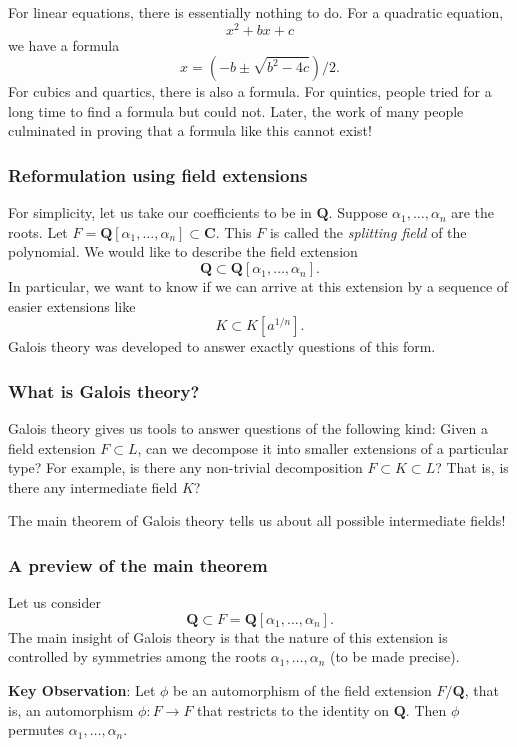 \documentclass[11pt]{article}
\begin{document}
For linear equations, there is essentially nothing to do.
For a quadratic equation,
\[ x^2 + bx + c\]
we have a formula
\[ x = (-b \pm \sqrt{b^2-4c})/2.\]
For cubics and quartics, there is also a formula.
For quintics, people tried for a long time to find a formula but could not.
Later, the work of many people culminated in proving that a formula like this cannot exist!
\subsubsection{Reformulation using field extensions}
\label{sec:orga31d0e6}
For simplicity, let us take our coefficients to be in \(\mathbf{Q}\).
Suppose \(\alpha_1, \dots, \alpha_n\) are the roots.
Let \(F = \mathbf{Q}[\alpha_1, \dots, \alpha_n] \subset \mathbf{C}\).
This \(F\) is called the \emph{splitting field} of the polynomial.
We would like to describe the field extension
\[ \mathbf{Q} \subset \mathbf{Q}[\alpha_1, \dots, \alpha_n].\] 
In particular, we want to know if we can arrive at this extension by a sequence of easier extensions like
\[ K \subset K[a^{1/n}].\]
Galois theory was developed to answer exactly questions of this form.
\subsubsection{What is Galois theory?}
\label{sec:org493a298}
Galois theory gives us tools to answer questions of the following kind:
Given a field extension \(F \subset L\), can we decompose it into smaller extensions of a particular type?
For example, is there any non-trivial decomposition \(F \subset K \subset L\)?
That is, is there any intermediate field \(K\)?

The main theorem of Galois theory tells us about all possible intermediate fields!
\subsubsection{A preview of the main theorem}
\label{sec:org60607cb}
Let us consider
\[ \mathbf{Q} \subset F = \mathbf{Q}[\alpha_1, \dots, \alpha_{n}].\]
The main insight of Galois theory is that the nature of this extension is controlled by symmetries among the roots \(\alpha_{1}, \dots, \alpha_n\) (to be made precise).

\textbf{\textbf{Key Observation}}: Let \(\phi\) be an automorphism of the field extension \(F / \mathbf{Q}\), that is, an automorphism \(\phi \colon F \to F\) that restricts to the identity on \(\mathbf{Q}\).
Then \(\phi\) permutes \(\alpha_1, \dots, \alpha_n\).
\end{document}
